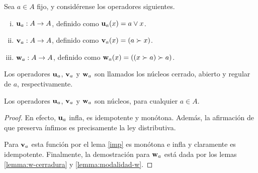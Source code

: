 \begin{definition}
Sea $a\in A$ fijo, y considérense los operadores siguientes.
  \begin{enumerate}[(i)]
    \item $\mathbf u_{a}:A\to A$, definido como $\mathbf u_{a}(x)= a\vee x$.
    \item $\mathbf v_{a}:A\to A$, definido como $\mathbf v_{a}(x)=(a\succ
    x)$.
    \item $\mathbf w_{a}:A\to A$, definido como
      $\mathbf w_{a}(x)=((x\succ a)\succ a)$.
  \end{enumerate}
  Los operadores $\mathbf u_{a}$, $\mathbf v_{a}$ y $\mathbf w_{a}$ son llamados
  los núcleos cerrado, abierto y regular de $a$, respectivamente.
\end{definition}
\begin{proposition}
  Los operadores $\mathbf u_{a}$, $\mathbf v_{a}$ y $\mathbf w_{a}$ son núcleos, para
  cualquier $a\in A$.
\end{proposition}
\begin{proof}
  En efecto, $\mathbf u_{a}$ infla, es idempotente
  y monótona. Además, la afirmación de que preserva ínfimos es
  precisamente la ley distributiva.

Para  $\mathbf v_{a}$ esta función por el lema \ref{imp} es monótona e infla y claramente es idempotente.     
Finalmente, la demostración para $\mathbf w_{a}$ está
dada por los lemas \ref{lemma:w-cerradura} y
\ref{lemma:modalidad-w}.
\end{proof}

